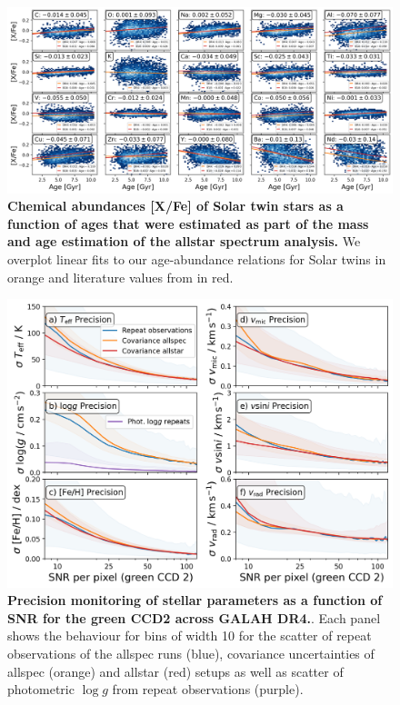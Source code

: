 \documentclass[
  journal=pasa,
  manuscript=research-paper, %
  year=2024,
  volume=37
]{cup-journal}
\newcommand{\logg}{$\log g$\xspace}
\begin{document}
\begin{figure}[ht]
 \centering
 \includegraphics[width=\textwidth]{figures/galah_dr4_age_xfe_trends_solar_twins_allstar.png}
 \caption{\textbf{Chemical abundances [X/Fe] of Solar twin stars as a function of ages that were estimated as part of the mass and age estimation of the allstar spectrum analysis.} We overplot linear fits to our age-abundance relations for Solar twins in orange and literature values from \citet{Bedell2018} in red.}
 \label{fig:galah_dr4_age_xfe_trends_solar_twins_allstar}
\end{figure}

\begin{figure}[ht]
 \centering
 \includegraphics[width=\textwidth]{figures/galah_dr4_precision_parameters.png}
 \caption{\textbf{Precision monitoring of stellar parameters as a function of SNR for the green CCD2 across GALAH DR4.}. Each panel shows the behaviour for bins of width 10 for the scatter of repeat observations of the allspec runs (blue), covariance uncertainties of allspec (orange) and allstar (red) setups as well as scatter of photometric \logg from repeat observations (purple).}
 \label{fig:galah_dr4_precision_parameters}
\end{figure}
\end{document}
